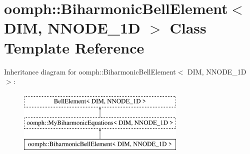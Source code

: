 \hypertarget{classoomph_1_1BiharmonicBellElement}{}\section{oomph\+:\+:Biharmonic\+Bell\+Element$<$ D\+IM, N\+N\+O\+D\+E\+\_\+1D $>$ Class Template Reference}
\label{classoomph_1_1BiharmonicBellElement}
Inheritance diagram for oomph\+:\+:Biharmonic\+Bell\+Element$<$ D\+IM, N\+N\+O\+D\+E\+\_\+1D $>$\+:\begin{figure}[H]
\begin{center}
\leavevmode
\includegraphics[height=3.000000cm]{classoomph_1_1BiharmonicBellElement}
\end{center}
\end{figure}
